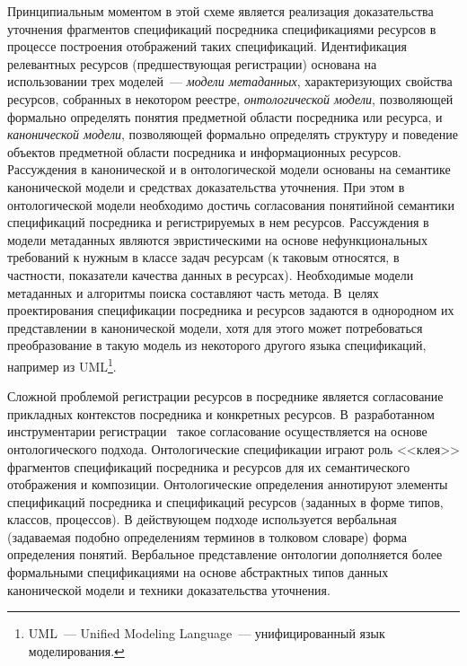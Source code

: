 \begin{multicols}{2}
     Принципиальным моментом в этой схеме %
     является реализация доказательства
уточнения фрагмен\-тов спецификаций посредника спецификациями ресурсов в процессе
построения отображений таких спецификаций. Идентификация релевантных ресурсов
(предшествующая регистрации) основана на использовании трех моделей~---
\textit{модели метаданных}, характеризующих свойства ресурсов, собранных в некотором
реестре, \textit{онтологической модели}, позволяющей формально определять понятия
предметной области посредника или ресурса, и \textit{канонической модели},
позволяющей формально определять структуру и поведение объектов предметной области
посредника и информационных ресурсов. Рассуждения в канонической и в
онтологической модели основаны на семантике канонической модели и средствах
доказательства уточнения. При этом в онтологической модели необходимо достичь
согласования понятийной семантики спецификаций посредника и регистрируемых в нем
ресурсов. Рассуждения в модели метаданных являются эвристическими на основе
нефункциональных требований к нужным в классе задач ресурсам (к таковым относятся, в
частности, показатели качества данных в ресурсах). Необходимые модели метаданных и
алгоритмы поиска составляют часть метода. В~целях проектирования спецификации
посредника и ресурсов задаются в однородном их представлении в канонической модели,
хотя для этого может потребоваться преобразование в такую модель из некоторого
другого языка спецификаций, например из UML\footnote{UML~--- Unified Modeling
Language~--- унифицированный язык моделирования.}.

Сложной проблемой регистрации ресурсов в посред\-ни\-ке является согласование
прикладных контекстов посредника и конкретных ресурсов. В~разработанном
инструментарии регистрации~\cite{Briu01} %
такое согласование осуществляется на основе %
онтоло\-ги\-че\-ско\-го подхода. Онтологические спецификации играют роль <<клея>> фрагментов
спецификаций посредника и ресурсов для их семантического отображения и композиции.
Онтологические определения аннотируют элементы спецификаций посредника и
спецификаций ресурсов (заданных в форме типов, классов, процессов). В дейст\-ву\-ющем
подходе используется вербальная (задаваемая подобно определениям терминов в
толковом словаре) форма определения понятий. Вербальное пред\-став\-ле\-ние онтологии
дополняется более формальными спецификациями на основе абстрактных типов данных
канонической модели и техники доказательства уточнения.


\end{multicols}
